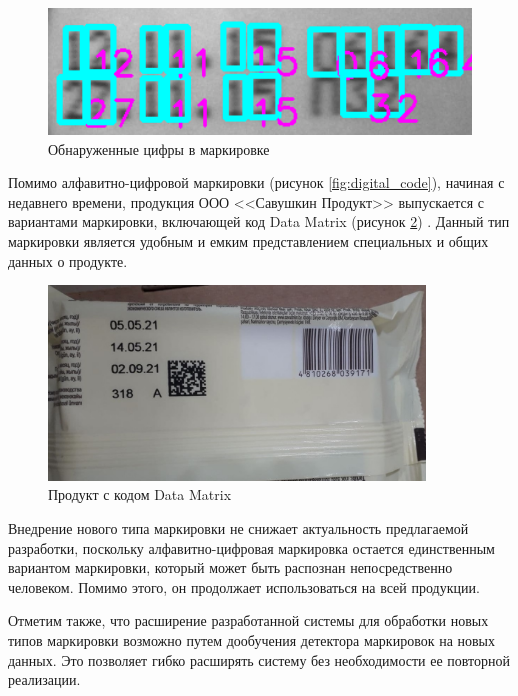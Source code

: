 \begin{figure}[!ht]
	\centering
	\includegraphics[width=12cm]{man-source/images/ch4/pic4-26.png}
	\caption{Обнаруженные цифры в маркировке}
	\label{fig:numbers_detect}
\end{figure}

Помимо алфавитно-цифровой маркировки (рисунок \ref{fig:digital_code}), начиная с недавнего времени, продукция ООО <<Савушкин Продукт>> выпускается с вариантами маркировки, включающей код Data Matrix (рисунок \ref{fig:data_matrix}) \cite{milk}. Данный тип маркировки является удобным и емким представлением специальных и общих данных о продукте. 


\begin{figure}[!ht]
	\centering
	\includegraphics[width=10cm]{man-source/images/ch4/pic4-2.jpg}
	\caption{Продукт с кодом Data Matrix}
	\label{fig:data_matrix}
\end{figure}

Внедрение нового типа маркировки не снижает актуальность предлагаемой разработки, поскольку алфавитно-цифровая маркировка остается единственным вариантом маркировки, который может быть распознан непосредственно человеком. Помимо этого, он продолжает использоваться на всей продукции.

Отметим также, что расширение разработанной системы для обработки новых типов маркировки возможно путем дообучения детектора маркировок на новых данных. Это позволяет гибко расширять систему без необходимости ее повторной реализации.

